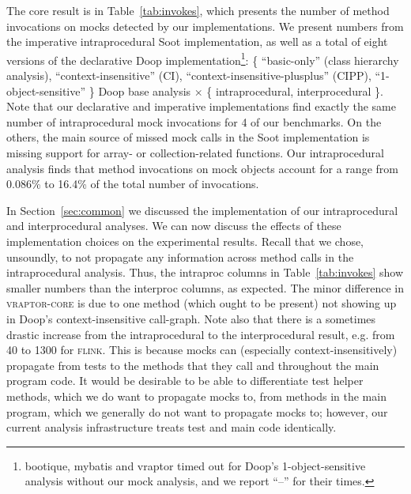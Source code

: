 The core result is in Table~\ref{tab:invokes}, which presents the number of method invocations on mocks detected by our implementations. We present numbers from the imperative intraprocedural Soot implementation, as well as a total of eight versions of the declarative Doop implementation\footnote{bootique, mybatis and vraptor timed out for Doop's 1-object-sensitive analysis without our mock analysis, and we report ``--'' for their times.}: \{ ``basic-only'' (class hierarchy analysis), ``context-insensitive'' (CI), ``context-insensitive-plusplus'' (CIPP), ``1-object-sensitive'' \} Doop base analysis $\times$ \{ intraprocedural, interprocedural \}. Note that our declarative and imperative implementations find exactly the same number of intraprocedural mock invocations for 4 of our benchmarks. On the others, the main source of missed mock calls in the Soot implementation is missing support for array- or collection-related functions. Our intraprocedural analysis finds that method invocations on mock objects account for a range from 0.086\% to 16.4\% of the total number of invocations. 


In Section~\ref{sec:common} we discussed the implementation of our intraprocedural and interprocedural analyses. We can now discuss the effects of these implementation choices on the experimental results. Recall that we chose, unsoundly, to not propagate any information across method calls in the intraprocedural analysis. Thus, the intraproc columns in Table~\ref{tab:invokes} show smaller numbers than the interproc columns, as expected. The minor difference in \textsc{vraptor-core} is due to one method (which ought to be present) not showing up in Doop's context-insensitive call-graph. Note also that there is a sometimes drastic increase from the intraprocedural to the interprocedural result, e.g. from 40 to 1300 for \textsc{flink}. This is because mocks can (especially context-insensitively) propagate from tests to the methods that they call and throughout the main program code. It would be desirable to be able to differentiate test helper methods, which we do want to propagate mocks to, from methods in the main program, which we generally do not want to propagate mocks to; however, our current analysis infrastructure treats test and main code identically.


